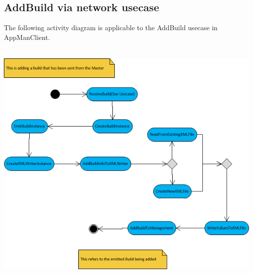 \documentclass[a4paper,12pt,final]{article}
\begin{document}
\subsection{AddBuild via network usecase}
The following activity diagram is applicable to the AddBuild usecase in AppManClient.\\
\textbf{\\}
\begin{center}
\includegraphics[scale=1]{AddBuildSlaveActivity.png}
\end{center}



\newpage
\end{document}
